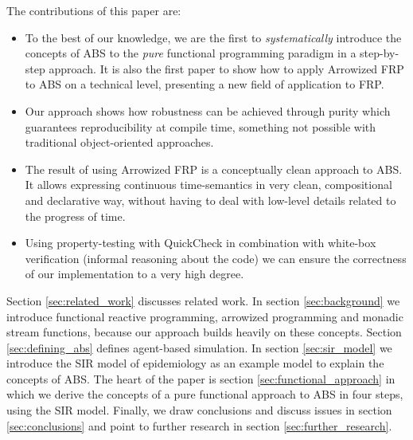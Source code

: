 The contributions of this paper are:
\begin{itemize}
	\item To the best of our knowledge, we are the first to \textit{systematically} introduce the concepts of ABS to the \textit{pure} functional programming paradigm in a step-by-step approach. It is also the first paper to show how to apply Arrowized FRP to ABS on a technical level, presenting a new field of application to FRP.
	\item Our approach shows how robustness can be achieved through purity which guarantees reproducibility at compile time, something not possible with traditional object-oriented approaches.
	\item The result of using Arrowized FRP is a conceptually clean approach to ABS. It allows expressing continuous time-semantics in very clean, compositional and declarative way, without having to deal with low-level details related to the progress of time.
	\item Using property-testing with QuickCheck in combination with white-box verification (informal reasoning about the code) we can ensure the correctness of our implementation to a very high degree.
\end{itemize}

Section \ref{sec:related_work} discusses related work. In section \ref{sec:background} we introduce functional reactive programming, arrowized programming and monadic stream functions, because our approach builds heavily on these concepts. Section \ref{sec:defining_abs} defines agent-based simulation. In section \ref{sec:sir_model} we introduce the SIR model of epidemiology as an example model to explain the concepts of ABS. The heart of the paper is section \ref{sec:functional_approach} in which we derive the concepts of a pure functional approach to ABS in four steps, using the SIR model. Finally, we draw conclusions and discuss issues in section \ref{sec:conclusions} and point to further research in section \ref{sec:further_research}.

